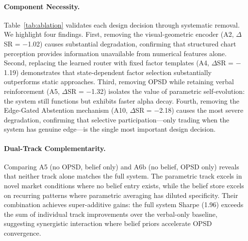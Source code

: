 \paragraph{Component Necessity.} Table~\ref{tab:ablation} validates each design decision through systematic removal. We highlight four findings. First, removing the visual-geometric encoder (A2, $\Delta$SR = $-$1.02) causes substantial degradation, confirming that structured chart perception provides information unavailable from numerical features alone. Second, replacing the learned router with fixed factor templates (A4, $\Delta$SR = $-$1.19) demonstrates that state-dependent factor selection substantially outperforms static approaches. Third, removing OPSD while retaining verbal reinforcement (A5, $\Delta$SR = $-$1.32) isolates the value of parametric self-evolution: the system still functions but exhibits faster alpha decay. Fourth, removing the Edge-Gated Abstention mechanism (A10, $\Delta$SR = $-$2.18) causes the most severe degradation, confirming that selective participation---only trading when the system has genuine edge---is the single most important design decision.

\paragraph{Dual-Track Complementarity.} Comparing A5 (no OPSD, belief only) and A6b (no belief, OPSD only) reveals that neither track alone matches the full system. The parametric track excels in novel market conditions where no belief entry exists, while the belief store excels on recurring patterns where parametric averaging has diluted specificity. Their combination achieves super-additive gains: the full system Sharpe (1.96) exceeds the sum of individual track improvements over the verbal-only baseline, suggesting synergistic interaction where belief priors accelerate OPSD convergence.

